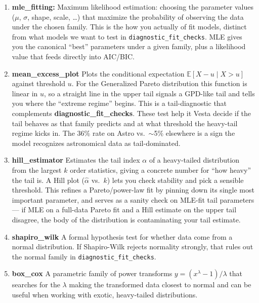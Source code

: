 \documentclass{article}
\newcommand{\method}{{\sc Vesta}}
\begin{document}
\begin{enumerate}
    \item \textbf{mle\_fitting:} Maximum likelihood estimation: choosing the parameter values ($\mu$, $\sigma$, shape, scale, \ldots) that maximize the probability of observing the data under the chosen family. This is the how you actually of fit models, distinct from what models we want to test in \texttt{diagnostic\_fit\_checks}. MLE gives you the canonical ``best'' parameters under a given family, plus a likelihood value that feeds directly into AIC/BIC. 

    \item \textbf{mean\_excess\_plot} Plots the conditional expectation $\mathbb{E}[X - u \mid X > u]$ against threshold $u$. For the Generalized Pareto distribution this function is linear in $u$, so a straight line in the upper tail signals a GPD-like tail and tells you where the ``extreme regime'' begins. This is a tail-diagnostic that complements \textbf{diagnostic\_fit\_checks}. These test help it \method{} decide if the tail behaves as that family predicts and at what threshold the heavy-tail regime kicks in. The 36\% rate on Astro vs.\ $\sim$5\% elsewhere is a sign the model recognizes astronomical data as tail-dominated.

    \item \textbf{hill\_estimator} Estimates the tail index $\alpha$ of a heavy-tailed distribution from the largest $k$ order statistics, giving a concrete number for ``how heavy'' the tail is. A Hill plot ($\hat{\alpha}$ vs.\ $k$) lets you check stability and pick a sensible threshold. This refines a Pareto/power-law fit by pinning down its single most important parameter, and serves as a sanity check on MLE-fit tail parameters --- if MLE on a full-data Pareto fit and a Hill estimate on the upper tail disagree, the body of the distribution is contaminating your tail estimate.

    \item \textbf{shapiro\_wilk} A formal hypothesis test for whether data come from a normal distribution. If Shapiro-Wilk rejects normality strongly, that rules out the normal family in \texttt{diagnostic\_fit\_checks}. 

    \item \textbf{box\_cox} A parametric family of power transforms $y = (x^{\lambda} - 1)/\lambda$ that searches for the $\lambda$ making the transformed data closest to normal and can be useful when working with exotic, heavy-tailed distributions.
\end{enumerate}
\end{document}
